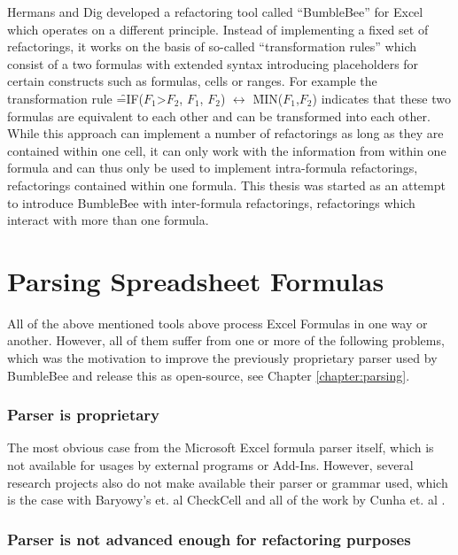 Hermans and Dig \cite{hermans2014bumblebee} developed a refactoring tool called ``BumbleBee'' for Excel which operates on a different principle.
Instead of implementing a fixed set of refactorings, it works on the basis of so-called ``transformation rules'' which consist of a two formulas with extended syntax introducing placeholders for certain constructs such as formulas, cells or ranges.
For example the transformation rule \f{=IF($F_1$>$F_2$, $F_1$, $F_2$)} $\leftrightarrow$ \f{MIN($F_1$,$F_2$)} indicates that these two formulas are equivalent to each other and can be transformed into each other.
While this approach can implement a number of refactorings as long as they are contained within one cell, it can only work with the information from within one formula and can thus only be used to implement intra-formula refactorings, refactorings contained within one formula.
This thesis was started as an attempt to introduce BumbleBee with inter-formula refactorings, refactorings which interact with more than one formula.

\section{Parsing Spreadsheet Formulas}

All of the above mentioned tools above process Excel Formulas in one way or another.
However, all of them suffer from one or more of the following problems, which was the motivation to improve the previously proprietary parser used by BumbleBee and release this as open-source, see Chapter \ref{chapter:parsing}.

\subsubsection{Parser is proprietary}

The most obvious case from the Microsoft Excel formula parser itself, which is not available for usages by external programs or Add-Ins.
However, several research projects also do not make available their parser or grammar used, which is the case with Baryowy's et. al CheckCell \cite{barowy2014checkcell} and all of the work by Cunha et. al \cite{cunha2010automatically, cunha2012towards, cunha2012mdsheet}.

\subsubsection{Parser is not advanced enough for refactoring purposes}

